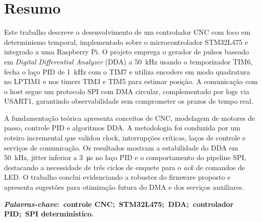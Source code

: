 \chapter*{Resumo}
\noindent Este trabalho descreve o desenvolvimento de um controlador CNC
com foco em determinismo temporal, implementado sobre o microcontrolador
STM32L475 e integrado a uma Raspberry Pi. O projeto emprega o gerador de
pulsos baseado em \emph{Digital Differential Analyzer} (DDA) a
\SI{50}{\kilo\hertz} usando o temporizador TIM6, fecha o laço PID de
\SI{1}{\kilo\hertz} com o TIM7 e utiliza encoders em modo quadratura no
LPTIM1 e nos timers TIM3 e TIM5 para estimar posição. A comunicação com o host
segue um protocolo SPI com DMA circular, complementado por logs via
USART1, garantindo observabilidade sem comprometer os prazos de tempo
real.

A fundamentação teórica apresenta conceitos de CNC, modelagem de motores
de passo, controle PID e algoritmos DDA. A metodologia foi conduzida por
um roteiro incremental que validou clock, interrupções críticas, laços
de controle e serviços de comunicação. Os resultados mostram a
estabilidade do DDA em \SI{50}{\kilo\hertz}, jitter inferior a
\SI{3}{\micro\second} no laço PID e o comportamento do pipeline SPI,
destacando a necessidade de três ciclos de enquete para o \emph{ack} de
comandos de LED. O trabalho conclui evidenciando a robustez do
firmware proposto e apresenta sugestões para otimização futura do DMA e
dos serviços auxiliares.

\vspace{5mm}

\noindent\textbf{\textit{Palavras-chave}:~controle CNC;~STM32L475;~DDA;~controlador PID;~SPI determinístico.}
